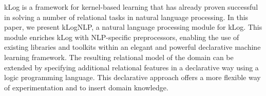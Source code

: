 kLog is a framework for kernel-based learning that has already proven successful in solving a number of relational tasks in natural language processing. In this paper, we present kLogNLP, a natural language processing module for kLog. This module enriches kLog with NLP-specific preprocessors, enabling the use of existing libraries and toolkits within an elegant and powerful declarative machine learning framework. The resulting relational model of the domain can be extended by specifying additional relational features in a declarative way using a logic programming language. This declarative approach offers a more flexible way of experimentation and to insert domain knowledge.
